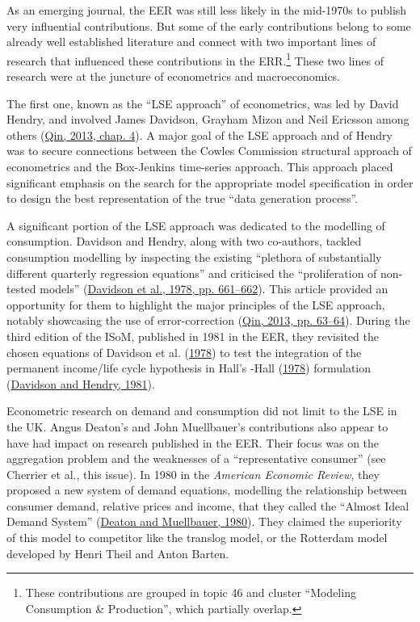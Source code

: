 \documentclass[
  12pt,
  onecolumn]{article}
\begin{document}
As an emerging journal, the EER was still less likely in the mid-1970s
to publish very influential contributions. But some of the early
contributions belong to some already well established literature and
connect with two important lines of research that influenced these
contributions in the ERR.\footnote{These contributions are grouped in
  topic 46 and cluster ``Modeling Consumption \& Production'', which
  partially overlap.} These two lines of research were at the juncture
of econometrics and macroeconomics.

The first one, known as the ``LSE approach'' of econometrics, was led by
David Hendry, and involved James Davidson, Grayham Mizon and Neil
Ericsson among others (\protect\hyperlink{ref-qin2013a}{Qin, 2013, chap.
4}). A major goal of the LSE approach and of Hendry was to secure
connections between the Cowles Commission structural approach of
econometrics and the Box-Jenkins time-series approach. This approach
placed significant emphasis on the search for the appropriate model
specification in order to design the best representation of the true
``data generation process''.

A significant portion of the LSE approach was dedicated to the modelling
of consumption. Davidson and Hendry, along with two co-authors, tackled
consumption modelling by inspecting the existing ``plethora of
substantially different quarterly regression equations'' and criticised
the ``proliferation of non-tested models''
(\protect\hyperlink{ref-davidson1978}{Davidson et al., 1978, pp.
661--662}). This article provided an opportunity for them to highlight
the major principles of the LSE approach, notably showcasing the use of
error-correction (\protect\hyperlink{ref-qin2013a}{Qin, 2013, pp.
63--64}). During the third edition of the ISoM, published in 1981 in the
EER, they revisited the chosen equations of Davidson et al.
(\protect\hyperlink{ref-davidson1978}{1978}) to test the integration of
the permanent income/life cycle hypothesis in Hall's -Hall
(\protect\hyperlink{ref-hall1978b}{1978}) formulation
(\protect\hyperlink{ref-davidson1981}{Davidson and Hendry, 1981}).

Econometric research on demand and consumption did not limit to the LSE
in the UK. Angus Deaton's and John Muellbauer's contributions also
appear to have had impact on research published in the EER. Their focus
was on the aggregation problem and the weaknesses of a ``representative
consumer'' (see Cherrier et al., this issue). In 1980 in the
\emph{American Economic Review}, they proposed a new system of demand
equations, modelling the relationship between consumer demand, relative
prices and income, that they called the ``Almost Ideal Demand System''
(\protect\hyperlink{ref-deaton1980}{Deaton and Muellbauer, 1980}). They
claimed the superiority of this model to competitor like the translog
model, or the Rotterdam model developed by Henri Theil and Anton Barten.
\end{document}

